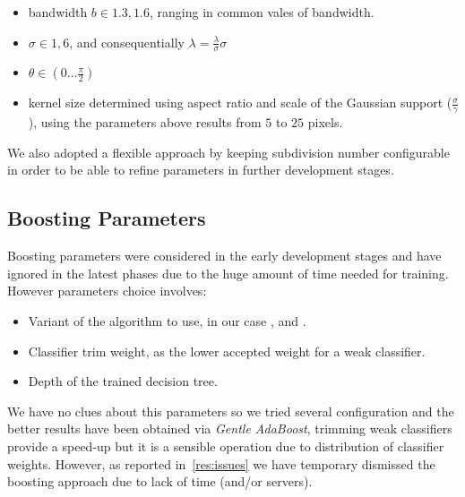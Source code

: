 \begin{itemize}
  \item bandwidth $b \in 1.3,1.6$, %
   ranging in common vales of bandwidth\cite{gaborBandwidth}.
  \item $\sigma \in 1,6$, and consequentially $\lambda = \frac{\lambda}{\sigma} \sigma $ 
  \item $\theta \in ( 0 \ldots \frac{\pi}{2} )$
  \item kernel size determined using aspect ratio and scale of the Gaussian support ($\frac{\sigma}{\gamma}$), using the parameters above results from $5$ to $25$ pixels.
\end{itemize}

We also adopted a flexible approach by keeping subdivision number configurable in order to be able to refine parameters in further development stages. 

\subsection{Boosting Parameters}

Boosting parameters were considered in the early development stages and have ignored in the latest phases due to the huge amount of time needed for  training. However parameters choice involves:

\begin{itemize}
\item Variant of the algorithm to use, in our case ,  and .
\item Classifier trim weight, as the lower accepted weight for a weak classifier.
\item Depth of the trained decision tree.
\end{itemize}

We have no clues about this parameters so we tried several configuration and the better results have been obtained via \emph{Gentle AdaBoost}, trimming weak classifiers provide a speed-up but it is a sensible operation due to distribution of classifier weights. However, as reported in~\ref{res:issues} we have temporary dismissed the boosting approach due to lack of time (and/or servers).

